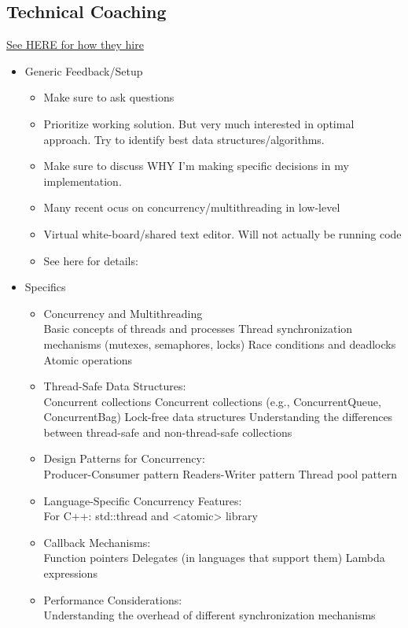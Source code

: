 \documentclass{article}
\begin{document}
\subsection{Technical Coaching}
\href{https://amazon.jobs/content/en/how-we-hire/sde-ii-interview-prep}{See HERE for how they hire}
\begin{itemize}
	\item Generic Feedback/Setup
	\begin{itemize}
		\item Make sure to ask questions
		\item Prioritize working solution. But very much interested in optimal approach. Try to identify best data structures/algorithms.
		\item Make sure to discuss WHY I'm making specific decisions in my implementation.
		\item Many recent ocus on concurrency/multithreading in low-level
		\item Virtual white-board/shared text editor. Will not actually be running code
		\item See here for details: 
	\end{itemize}
	\item Specifics
		\begin{itemize}
			\item Concurrency and Multithreading \\
Basic concepts of threads and processes
Thread synchronization mechanisms (mutexes, semaphores, locks)
Race conditions and deadlocks
Atomic operations
			\item Thread-Safe Data Structures: \\
Concurrent collections
Concurrent collections (e.g., ConcurrentQueue, ConcurrentBag)
Lock-free data structures
Understanding the differences between thread-safe and non-thread-safe collections
			\item Design Patterns for Concurrency: \\
Producer-Consumer pattern
Readers-Writer pattern
Thread pool pattern
			\item Language-Specific Concurrency Features: \\
				For C++: std::thread and <atomic> library
			\item Callback Mechanisms: \\
Function pointers
Delegates (in languages that support them)
Lambda expressions
			\item Performance Considerations: \\
Understanding the overhead of different synchronization mechanisms

\end{itemize}
\end{itemize}
\end{document}
